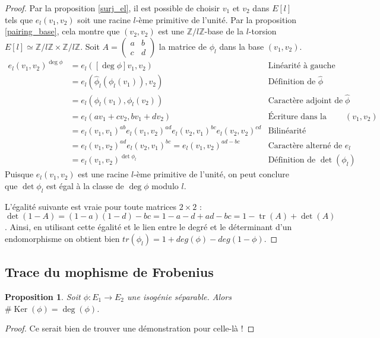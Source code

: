 \documentclass{article}
\theoremstyle{plain}%
\newtheorem{prop}[thm]{Proposition}
\theoremstyle{definition}%
\newcommand{\Z}{\mathbb{Z}}
\newcommand{\h}{\widehat}
\DeclareMathOperator{\tr}{tr}
\DeclareMathOperator{\Ker}{Ker}
\begin{document}
\begin{proof}
  Par la proposition \ref{surj_el}, il est possible de choisir $v_1$ et $v_2$ dans $E[l]$ tels que $e_l(v_1, v_2)$ soit une racine $l$-ème primitive de l'unité. Par la proposition \ref{pairing_base}, cela montre que $(v_2, v_2)$ est une $\Z/l\Z$-base de la $l$-torsion $E[l] \simeq \Z/l\Z\times\Z/l\Z$. 
  Soit $A = \begin{pmatrix} a & b \\ c & d \end{pmatrix}$ la matrice de $\phi_l$ dans la base $(v_1, v_2)$.
  \begin{align*}
  e_l(v_1, v_2)^{\deg\phi} 
  &= e_l([\deg\phi]v_1, v_2) & \text{Linéarité à gauche} \\
  &= e_l(\h\phi_l(\phi_l(v_1)), v_2) & \text{Définition de $\h\phi$} \\
  &= e_l(\phi_l(v_1), \phi_l(v_2)) & \text{Caractère adjoint de $\h\phi$} \\
  &= e_l(av_1+cv_2, bv_1+dv_2) & \text{Écriture dans la base $(v_1, v_2)$} \\
  &= e_l(v_1, v_1)^{ab} e_l(v_1, v_2)^{ad} e_l(v_2, v_1)^{bc} e_l(v_2, v_2)^{cd} & \text{Bilinéarité} \\
  &= e_l(v_1, v_2)^{ad} e_l(v_2, v_1)^{bc} = e_l(v_1, v_2)^{ad-bc} & \text{Caractère alterné de $e_l$} \\
  &= e_l(v_1, v_2)^{\det\phi_l} & \text{Définition de $\det(\phi_l)$}
  \end{align*}
  Puisque $e_l(v_1, v_2)$ est une racine $l$-ème primitive de l'unité, on peut conclure que $\det\phi_l$ est égal à la classe de $\deg\phi$ modulo $l$.

   L'égalité suivante est vraie pour toute matrices $2\times 2$ : $\det(1-A) = (1-a)(1-d) - bc = 1 -a -d + ad -bc = 1 - \tr(A) + \det(A)$. Ainsi, en utilisant cette égalité et le lien entre le degré et le déterminant d'un endomorphisme on obtient bien $tr(\phi_l) = 1 + deg(\phi) - deg(1-\phi)$.   
\end{proof}

\subsection{Trace du mophisme de Frobenius}

\begin{prop}
  Soit $\phi:E_1\to E_2$ une isogénie séparable. Alors $\# \Ker(\phi) = \deg(\phi)$.  
\end{prop}

\begin{proof}
  {\color{red} Ce serait bien de trouver une démonstration pour celle-là !}
\end{proof}
\end{document}
